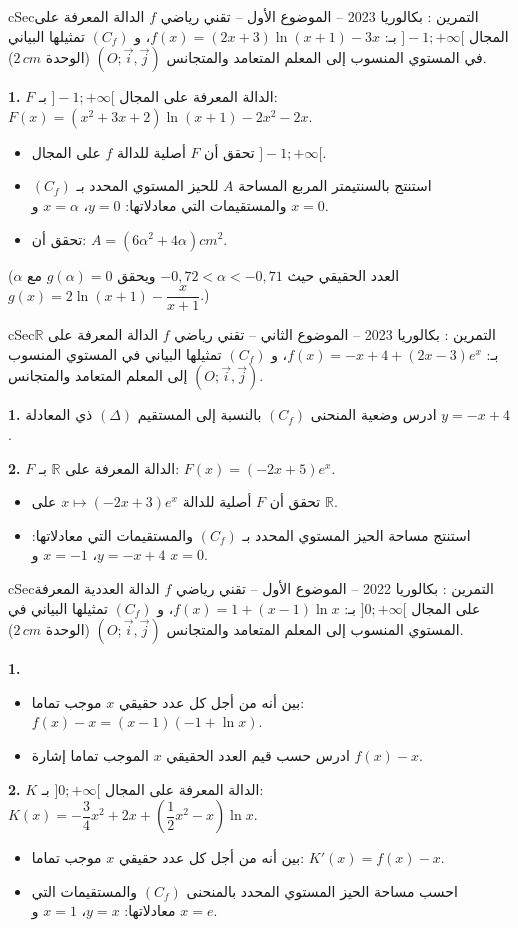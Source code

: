 \documentclass[12pt,a4paper]{article}
\newenvironment{BOX}[2]{\begin{otherlanguage}{english}\begin{arbox}{#1}{#2}}{\end{arbox}\end{otherlanguage}}
\newcounter{exo}
\newenvironment{tamrin}[1]{\stepcounter{exo}\begin{BOX}{cSec}{التمرين \theexo: #1}}{\end{BOX}}
\newcommand{\R}{\mathbb{R}}
\newenvironment{sq}{\begin{itemize}[leftmargin=2.4em,itemsep=3pt]}{\end{itemize}}
\newcommand{\qa}{\item[(أ)]}\newcommand{\qb}{\item[(ب)]}\newcommand{\qc}{\item[(جـ)]}\newcommand{\qd}{\item[(د)]}\newcommand{\qe}{\item[(هـ)]}
\newcommand{\QQ}[1]{\par\smallskip\textbf{#1.} }
\begin{document}
\begin{tamrin}{بكالوريا 2023 -- الموضوع الأول -- تقني رياضي}
$f$ الدالة المعرفة على المجال $]-1;+\infty[$ بـ: $f(x)=(2x+3)\ln(x+1)-3x$، و $(C_f)$ تمثيلها البياني في المستوي المنسوب إلى المعلم المتعامد والمتجانس $(O;\vec{i},\vec{j})$ (الوحدة $2\,cm$).

\QQ{1} $F$ الدالة المعرفة على المجال $]-1;+\infty[$ بـ: $F(x)=\left(x^{2}+3x+2\right)\ln(x+1)-2x^{2}-2x$.
\begin{sq}
\qa تحقق أن $F$ أصلية للدالة $f$ على المجال $]-1;+\infty[$.
\qb استنتج بالسنتيمتر المربع المساحة $A$ للحيز المستوي المحدد بـ $(C_f)$ والمستقيمات التي معادلاتها: $y=0$، $x=\alpha$ و $x=0$.
\qc تحقق أن: $A=\left(6\alpha^{2}+4\alpha\right)cm^{2}$.
\end{sq}
($\alpha$ العدد الحقيقي حيث $-0{,}72<\alpha<-0{,}71$ ويحقق $g(\alpha)=0$ مع $g(x)=2\ln(x+1)-\dfrac{x}{x+1}$.)
\end{tamrin}

\begin{tamrin}{بكالوريا 2023 -- الموضوع الثاني -- تقني رياضي}
$f$ الدالة المعرفة على $\R$ بـ: $f(x)=-x+4+(2x-3)e^{x}$، و $(C_f)$ تمثيلها البياني في المستوي المنسوب إلى المعلم المتعامد والمتجانس $(O;\vec{i},\vec{j})$.

\QQ{1} ادرس وضعية المنحنى $(C_f)$ بالنسبة إلى المستقيم $(\Delta)$ ذي المعادلة $y=-x+4$.

\QQ{2} $F$ الدالة المعرفة على $\R$ بـ: $F(x)=(-2x+5)e^{x}$.
\begin{sq}
\qa تحقق أن $F$ أصلية للدالة $x\mapsto(-2x+3)e^{x}$ على $\R$.
\qb استنتج مساحة الحيز المستوي المحدد بـ $(C_f)$ والمستقيمات التي معادلاتها: $y=-x+4$، $x=-1$ و $x=0$.
\end{sq}
\end{tamrin}

\begin{tamrin}{بكالوريا 2022 -- الموضوع الأول -- تقني رياضي}
$f$ الدالة العددية المعرفة على المجال $]0;+\infty[$ بـ: $f(x)=1+(x-1)\ln x$، و $(C_f)$ تمثيلها البياني في المستوي المنسوب إلى المعلم المتعامد والمتجانس $(O;\vec{i},\vec{j})$ (الوحدة $2\,cm$).

\QQ{1}
\begin{sq}
\qa بين أنه من أجل كل عدد حقيقي $x$ موجب تماما: $f(x)-x=(x-1)(-1+\ln x)$.
\qb ادرس حسب قيم العدد الحقيقي $x$ الموجب تماما إشارة $f(x)-x$.
\end{sq}
\QQ{2} $K$ الدالة المعرفة على المجال $]0;+\infty[$ بـ: $K(x)=-\dfrac34x^{2}+2x+\left(\dfrac12x^{2}-x\right)\ln x$.
\begin{sq}
\qa بين أنه من أجل كل عدد حقيقي $x$ موجب تماما: $K'(x)=f(x)-x$.
\qb احسب مساحة الحيز المستوي المحدد بالمنحنى $(C_f)$ والمستقيمات التي معادلاتها: $y=x$، $x=1$ و $x=e$.
\end{sq}
\end{tamrin}
\end{document}
